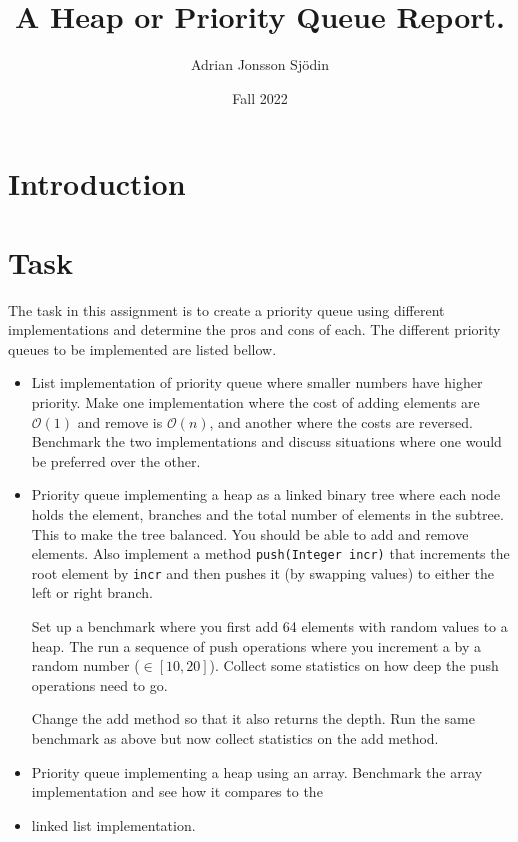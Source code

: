 \documentclass[a4paper,11pt]{article}
\begin{document}
\title{
    \textbf{A Heap or Priority Queue Report.}
}
\author{Adrian Jonsson Sjödin}
\date{Fall 2022}

\maketitle

\section{Introduction}
\label{intro}


\section{Task}
\label{task}
The task in this assignment is to create a priority queue using different implementations and determine
the pros and cons of each. The different priority queues to be implemented are listed bellow.
\begin{itemize}
    \item List implementation of priority queue where smaller numbers have higher priority. Make one implementation
    where the cost of adding elements are $\mathcal{O}(1)$ and remove is $\mathcal{O}(n)$, and another where the costs are reversed.
    Benchmark the two implementations and discuss situations where one would be preferred over the other.
    
    \item Priority queue implementing a heap as a linked binary tree where each node holds the element, branches and 
    the total number of elements in the subtree. This to make the tree balanced. You should be able to add and remove elements.
    Also implement a method {\tt push(Integer incr)} that increments the root element by {\tt incr} and then pushes it (by swapping 
    values) to either the left or right branch.

    Set up a benchmark where you first add 64 elements with random values to a heap. The run a sequence of push operations 
    where you increment a by a random number ($\in[10,20]$). Collect some statistics on how deep the push operations need to go.
    
    Change the add method so that it also returns the depth. Run the same benchmark as above but now collect statistics on the 
    add method.

    \item Priority queue implementing a heap using an array. Benchmark the array implementation and see how it compares to the 
    \item linked list implementation.

\end{itemize}
\end{document}
